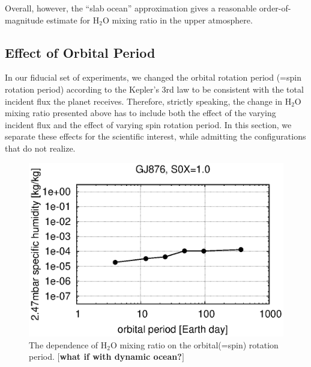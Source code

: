 \documentclass[11pt,numberedappendix,twocolappendix,]{emulateapj}
\def\water{H$_2$O }
\def\memo#1{\color{red}$[${\bf #1}$]$ \color{black}}
\begin{document}
Overall, however, the ``slab ocean'' approximation gives a reasonable order-of-magnitude estimate for \water mixing ratio in the upper atmosphere. 

\subsection{Effect of Orbital Period}
\label{ss:sensitivity_Porbit}

In our fiducial set of experiments, we changed the orbital rotation period (=spin rotation period) according to the Kepler's 3rd law to be consistent with the total incident flux the planet receives. 
Therefore, strictly speaking, the change in \water mixing ratio presented above has to include both the effect of the varying incident flux and the effect of varying spin rotation period. 
In this section, we separate these effects for the scientific interest, while admitting the configurations that do not realize. 

\begin{figure}[!h]
    \begin{center}
    \includegraphics[width=\hsize]{fig/AqOH0TLS_GJ876_q_sensitivity_changeP.eps}
    \end{center}
\caption{The dependence of \water mixing ratio on the orbital(=spin) rotation period. \memo{what if with dynamic ocean?}}                                                                                                             
\label{fig:changeP}
\end{figure}
\end{document}
